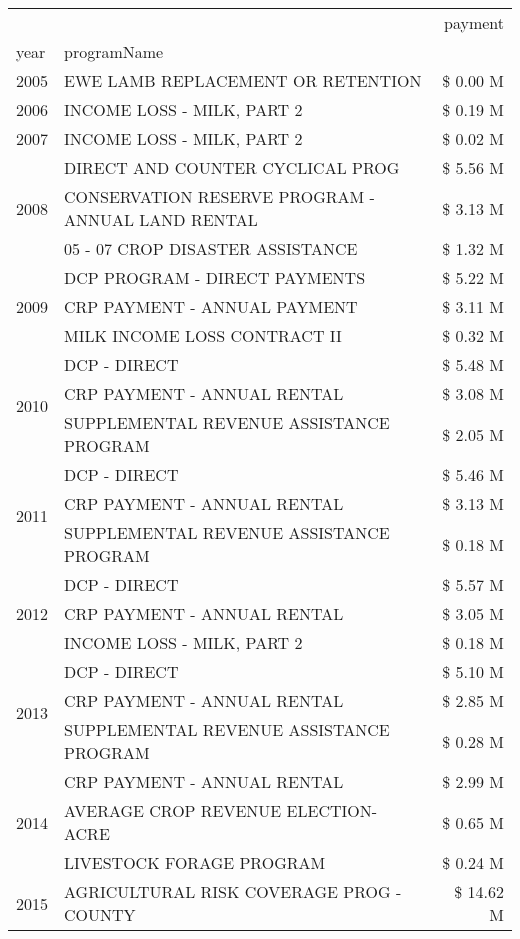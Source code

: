 \begin{tabular}{llr}
\toprule
 &  & payment \\
year & programName &  \\
\midrule
2005 & EWE LAMB REPLACEMENT OR RETENTION & \$ 0.00 M \\
\cline{1-3}
2006 & INCOME LOSS - MILK, PART 2 & \$ 0.19 M \\
\cline{1-3}
2007 & INCOME LOSS - MILK, PART 2 & \$ 0.02 M \\
\cline{1-3}
\multirow[t]{3}{*}{2008} & DIRECT AND COUNTER CYCLICAL PROG & \$ 5.56 M \\
 & CONSERVATION RESERVE PROGRAM - ANNUAL LAND RENTAL & \$ 3.13 M \\
 & 05 - 07 CROP DISASTER ASSISTANCE & \$ 1.32 M \\
\cline{1-3}
\multirow[t]{3}{*}{2009} & DCP PROGRAM - DIRECT PAYMENTS & \$ 5.22 M \\
 & CRP PAYMENT - ANNUAL PAYMENT & \$ 3.11 M \\
 & MILK INCOME LOSS CONTRACT II & \$ 0.32 M \\
\cline{1-3}
\multirow[t]{3}{*}{2010} & DCP - DIRECT & \$ 5.48 M \\
 & CRP PAYMENT - ANNUAL RENTAL & \$ 3.08 M \\
 & SUPPLEMENTAL REVENUE ASSISTANCE PROGRAM & \$ 2.05 M \\
\cline{1-3}
\multirow[t]{3}{*}{2011} & DCP - DIRECT & \$ 5.46 M \\
 & CRP PAYMENT - ANNUAL RENTAL & \$ 3.13 M \\
 & SUPPLEMENTAL REVENUE ASSISTANCE PROGRAM & \$ 0.18 M \\
\cline{1-3}
\multirow[t]{3}{*}{2012} & DCP - DIRECT & \$ 5.57 M \\
 & CRP PAYMENT - ANNUAL RENTAL & \$ 3.05 M \\
 & INCOME LOSS - MILK, PART 2 & \$ 0.18 M \\
\cline{1-3}
\multirow[t]{3}{*}{2013} & DCP - DIRECT & \$ 5.10 M \\
 & CRP PAYMENT - ANNUAL RENTAL & \$ 2.85 M \\
 & SUPPLEMENTAL REVENUE ASSISTANCE PROGRAM & \$ 0.28 M \\
\cline{1-3}
\multirow[t]{3}{*}{2014} & CRP PAYMENT - ANNUAL RENTAL & \$ 2.99 M \\
 & AVERAGE CROP REVENUE ELECTION-ACRE & \$ 0.65 M \\
 & LIVESTOCK FORAGE PROGRAM & \$ 0.24 M \\
\cline{1-3}
\multirow[t]{3}{*}{2015} & AGRICULTURAL RISK COVERAGE PROG - COUNTY & \$ 14.62 M \\

\end{tabular}
